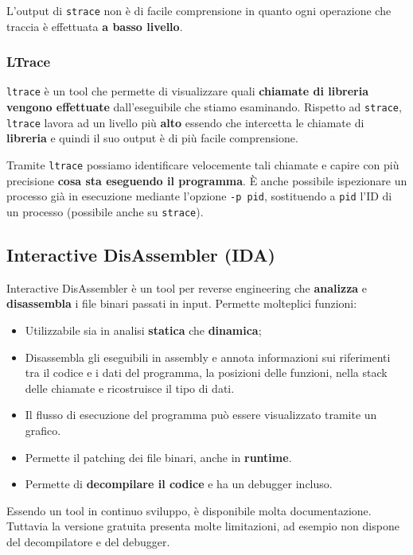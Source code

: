 \documentclass{article}
\begin{document}
L'output di \verb|strace| non è di facile comprensione in quanto ogni operazione che traccia è effettuata \textbf{a basso livello}.

\subsubsection{LTrace}
\verb|ltrace| è un tool che permette di visualizzare quali \textbf{chiamate di libreria vengono effettuate} dall’eseguibile che stiamo esaminando. 
Rispetto ad \verb|strace|, \verb|ltrace| lavora ad un livello più \textbf{alto} essendo che intercetta le chiamate di \textbf{libreria} e quindi il suo output è di più facile comprensione.

Tramite \verb|ltrace| possiamo identificare velocemente tali chiamate e capire con più precisione \textbf{cosa sta eseguendo il programma}. È anche possibile ispezionare un processo già in esecuzione mediante l’opzione \verb|-p pid|, sostituendo a \verb|pid| l’ID di un processo (possibile anche su \verb|strace|).

\subsection{Interactive DisAssembler (IDA)}
Interactive DisAssembler è un tool per reverse engineering che \textbf{analizza} e \textbf{disassembla} i file binari passati in input. Permette molteplici funzioni:
\begin{itemize}
	\item Utilizzabile sia in analisi \textbf{statica} che \textbf{dinamica};
	
	\item Disassembla gli eseguibili in assembly e annota informazioni sui riferimenti tra il codice e i dati del programma, la posizioni delle funzioni, nella stack delle chiamate e ricostruisce il tipo di dati.
	
	\item Il flusso di esecuzione del programma può essere visualizzato tramite un grafico.
	
	\item Permette il patching dei file binari, anche in \textbf{runtime}.
	
	\item Permette di \textbf{decompilare il codice} e ha un debugger incluso.
\end{itemize}

Essendo un tool in continuo sviluppo, è disponibile molta documentazione.
Tuttavia la versione gratuita presenta molte limitazioni, ad esempio non dispone del decompilatore e del debugger.
\end{document}
